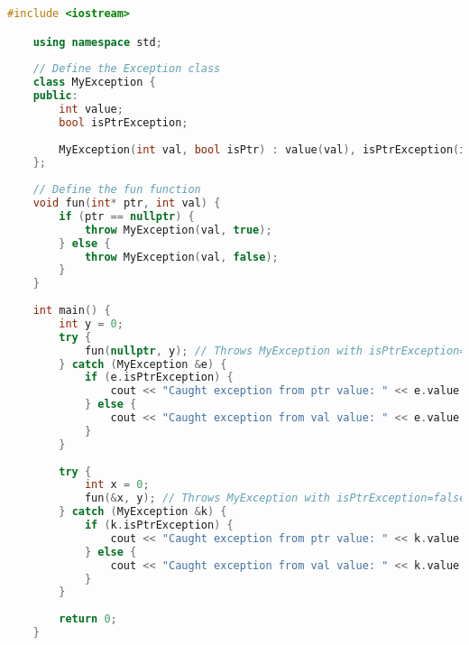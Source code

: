 \documentclass{article}
\begin{document}
\begin{lstlisting}[language=C++, caption=Example of handling multiple exceptions]
    #include <iostream>

    using namespace std;
    
    // Define the Exception class
    class MyException {
    public:
        int value;
        bool isPtrException;
    
        MyException(int val, bool isPtr) : value(val), isPtrException(isPtr) {}
    };
    
    // Define the fun function
    void fun(int* ptr, int val) {
        if (ptr == nullptr) {
            throw MyException(val, true);
        } else {
            throw MyException(val, false);
        }
    }
    
    int main() {
        int y = 0;
        try {
            fun(nullptr, y); // Throws MyException with isPtrException=true
        } catch (MyException &e) {
            if (e.isPtrException) {
                cout << "Caught exception from ptr value: " << e.value << endl;
            } else {
                cout << "Caught exception from val value: " << e.value << endl;
            }
        }
    
        try {
            int x = 0;
            fun(&x, y); // Throws MyException with isPtrException=false
        } catch (MyException &k) {
            if (k.isPtrException) {
                cout << "Caught exception from ptr value: " << k.value << endl;
            } else {
                cout << "Caught exception from val value: " << k.value << endl;
            }
        }
    
        return 0;
    }
    
\end{lstlisting}
\end{document}
